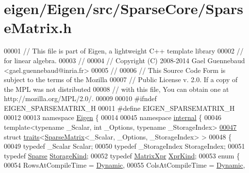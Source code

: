 \hypertarget{eigen_2_eigen_2src_2_sparse_core_2_sparse_matrix_8h_source}{}\section{eigen/\+Eigen/src/\+Sparse\+Core/\+Sparse\+Matrix.h}
\label{eigen_2_eigen_2src_2_sparse_core_2_sparse_matrix_8h_source}

\begin{DoxyCode}
00001 \textcolor{comment}{// This file is part of Eigen, a lightweight C++ template library}
00002 \textcolor{comment}{// for linear algebra.}
00003 \textcolor{comment}{//}
00004 \textcolor{comment}{// Copyright (C) 2008-2014 Gael Guennebaud <gael.guennebaud@inria.fr>}
00005 \textcolor{comment}{//}
00006 \textcolor{comment}{// This Source Code Form is subject to the terms of the Mozilla}
00007 \textcolor{comment}{// Public License v. 2.0. If a copy of the MPL was not distributed}
00008 \textcolor{comment}{// with this file, You can obtain one at http://mozilla.org/MPL/2.0/.}
00009 
00010 \textcolor{preprocessor}{#ifndef EIGEN\_SPARSEMATRIX\_H}
00011 \textcolor{preprocessor}{#define EIGEN\_SPARSEMATRIX\_H}
00012 
00013 \textcolor{keyword}{namespace }\hyperlink{namespace_eigen}{Eigen} \{ 
00014 
00045 \textcolor{keyword}{namespace }\hyperlink{namespaceinternal}{internal} \{
00046 \textcolor{keyword}{template}<\textcolor{keyword}{typename} \_Scalar, \textcolor{keywordtype}{int} \_Options, \textcolor{keyword}{typename} \_StorageIndex>
\hyperlink{struct_eigen_1_1internal_1_1traits_3_01_sparse_matrix_3_01___scalar_00_01___options_00_01___storage_index_01_4_01_4}{00047} \textcolor{keyword}{struct }\hyperlink{struct_eigen_1_1internal_1_1traits}{traits}<\hyperlink{group___sparse_core___module_class_eigen_1_1_sparse_matrix}{SparseMatrix}<\_Scalar, \_Options, \_StorageIndex> >
00048 \{
00049   \textcolor{keyword}{typedef} \_Scalar Scalar;
00050   \textcolor{keyword}{typedef} \_StorageIndex StorageIndex;
00051   \textcolor{keyword}{typedef} \hyperlink{struct_eigen_1_1_sparse}{Sparse} \hyperlink{struct_eigen_1_1_sparse}{StorageKind};
00052   \textcolor{keyword}{typedef} \hyperlink{struct_eigen_1_1_matrix_xpr}{MatrixXpr} \hyperlink{struct_eigen_1_1_matrix_xpr}{XprKind};
00053   \textcolor{keyword}{enum} \{
00054     RowsAtCompileTime = \hyperlink{namespace_eigen_ad81fa7195215a0ce30017dfac309f0b2}{Dynamic},
00055     ColsAtCompileTime = \hyperlink{namespace_eigen_ad81fa7195215a0ce30017dfac309f0b2}{Dynamic},

\end{DoxyCode}
